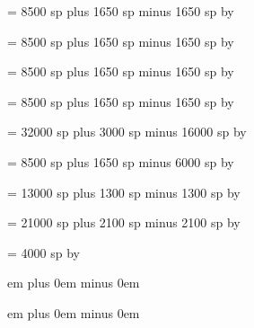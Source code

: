 \newskip\spaceafterminor
\spaceafterminor = 8500 sp plus 1650 sp minus 1650 sp
\multiply\spaceafterminor by \factor

\newskip\spacebeforemaior
\spacebeforemaior = 8500 sp plus 1650 sp minus 1650 sp
\multiply\spacebeforemaior by \factor

\newskip\spaceaftermaior
\spaceaftermaior = 8500 sp plus 1650 sp minus 1650 sp
\multiply\spaceaftermaior by \factor

\newskip\spacebeforefinalis
\spacebeforefinalis = 8500 sp plus 1650 sp minus 1650 sp
\multiply\spacebeforefinalis by \factor

\newskip\spacebeforefinalfinalis
\spacebeforefinalfinalis= 32000 sp plus 3000 sp minus 16000 sp
\multiply\spacebeforefinalfinalis by \factor

\newskip\spaceafterfinalis
\spaceafterfinalis = 8500 sp plus 1650 sp minus 6000 sp
\multiply\spaceafterfinalis by \factor

\newskip\textbartextspace
\textbartextspace = 13000 sp plus 1300 sp minus 1300 sp
\multiply\textbartextspace by \factor

\newskip\notebarspace
\notebarspace = 21000 sp plus 2100 sp minus 2100 sp
\multiply\notebarspace by \factor

\newdimen\maximumspacewithoutdash
\maximumspacewithoutdash = 4000 sp
\multiply\maximumspacewithoutdash by \factor

\newskip\afterinitialshift
{} em plus 0em minus 0em

\newskip\beforeinitialshift
{} em plus 0em minus 0em

\def\setspaceafterinitial#1{%
\afterinitialshift=#1 %
\relax %
}

\def\setspacebeforeinitial#1{%
\beforeinitialshift=#1 %
\relax %
}

\newskip\clefchangespace


\def\Abar{%
{\gregoriansymbolfont \char 64}%
\relax%
}

\def\Rbar{%
{\gregoriansymbolfont \char 65}%
\relax%
}

\def\Vbar{%
{\gregoriansymbolfont \char 66}%
\relax%
}

